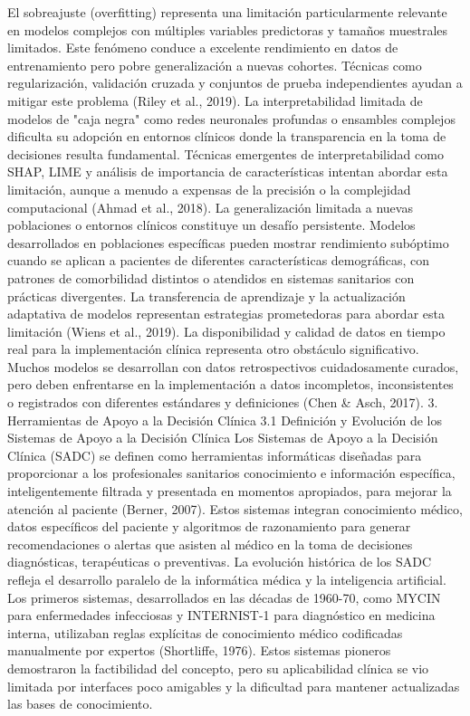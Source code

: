 \documentclass{article}
\begin{document}
\begin{multicols}{2}
El sobreajuste (overfitting) representa una limitación particularmente relevante en modelos complejos con múltiples variables predictoras y tamaños muestrales limitados. Este fenómeno conduce a excelente rendimiento en datos de entrenamiento pero pobre generalización a nuevas cohortes. Técnicas como regularización, validación cruzada y conjuntos de prueba independientes ayudan a mitigar este problema (Riley et al., 2019).
La interpretabilidad limitada de modelos de "caja negra" como redes neuronales profundas o ensambles complejos dificulta su adopción en entornos clínicos donde la transparencia en la toma de decisiones resulta fundamental. Técnicas emergentes de interpretabilidad como SHAP, LIME y análisis de importancia de características intentan abordar esta limitación, aunque a menudo a expensas de la precisión o la complejidad computacional (Ahmad et al., 2018).
La generalización limitada a nuevas poblaciones o entornos clínicos constituye un desafío persistente. Modelos desarrollados en poblaciones específicas pueden mostrar rendimiento subóptimo cuando se aplican a pacientes de diferentes características demográficas, con patrones de comorbilidad distintos o atendidos en sistemas sanitarios con prácticas divergentes. La transferencia de aprendizaje y la actualización adaptativa de modelos representan estrategias prometedoras para abordar esta limitación (Wiens et al., 2019).
La disponibilidad y calidad de datos en tiempo real para la implementación clínica representa otro obstáculo significativo. Muchos modelos se desarrollan con datos retrospectivos cuidadosamente curados, pero deben enfrentarse en la implementación a datos incompletos, inconsistentes o registrados con diferentes estándares y definiciones (Chen \& Asch, 2017).
 3. Herramientas de Apoyo a la Decisión Clínica
 3.1 Definición y Evolución de los Sistemas de Apoyo a la Decisión Clínica
Los Sistemas de Apoyo a la Decisión Clínica (SADC) se definen como herramientas informáticas diseñadas para proporcionar a los profesionales sanitarios conocimiento e información específica, inteligentemente filtrada y presentada en momentos apropiados, para mejorar la atención al paciente (Berner, 2007). Estos sistemas integran conocimiento médico, datos específicos del paciente y algoritmos de razonamiento para generar recomendaciones o alertas que asisten al médico en la toma de decisiones diagnósticas, terapéuticas o preventivas.
La evolución histórica de los SADC refleja el desarrollo paralelo de la informática médica y la inteligencia artificial. Los primeros sistemas, desarrollados en las décadas de 1960-70, como MYCIN para enfermedades infecciosas y INTERNIST-1 para diagnóstico en medicina interna, utilizaban reglas explícitas de conocimiento médico codificadas manualmente por expertos (Shortliffe, 1976). Estos sistemas pioneros demostraron la factibilidad del concepto, pero su aplicabilidad clínica se vio limitada por interfaces poco amigables y la dificultad para mantener actualizadas las bases de conocimiento.

\end{multicols}
\end{document}
